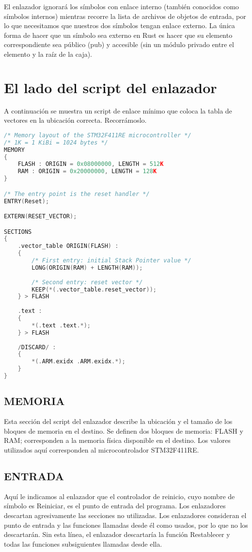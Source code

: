 El enlazador ignorará los símbolos con enlace interno (también conocidos como símbolos internos) mientras recorre la lista de archivos de objetos de entrada, por lo que necesitamos que nuestros dos símbolos tengan enlace externo. La única forma de hacer que un símbolo sea externo en Rust es hacer que su elemento correspondiente sea público (pub) y accesible (sin un módulo privado entre el elemento y la raíz de la caja).

\section{El lado del script del enlazador}

A continuación se muestra un script de enlace mínimo que coloca la tabla de vectores en la ubicación correcta. Recorrámoslo.

\begin{lstlisting}[language=c]
/* Memory layout of the STM32F411RE microcontroller */
/* 1K = 1 KiBi = 1024 bytes */
MEMORY
{
	FLASH : ORIGIN = 0x08000000, LENGTH = 512K
	RAM : ORIGIN = 0x20000000, LENGTH = 128K
}

/* The entry point is the reset handler */
ENTRY(Reset);

EXTERN(RESET_VECTOR);

SECTIONS
{
	.vector_table ORIGIN(FLASH) :
	{
		/* First entry: initial Stack Pointer value */
		LONG(ORIGIN(RAM) + LENGTH(RAM));
		
		/* Second entry: reset vector */
		KEEP(*(.vector_table.reset_vector));
	} > FLASH
	
	.text :
	{
		*(.text .text.*);
	} > FLASH
	
	/DISCARD/ :
	{
		*(.ARM.exidx .ARM.exidx.*);
	}
}

\end{lstlisting}


\subsection{MEMORIA}
Esta sección del script del enlazador describe la ubicación y el tamaño de los bloques de memoria en el destino. Se definen dos bloques de memoria: FLASH y RAM; corresponden a la memoria física disponible en el destino. Los valores utilizados aquí corresponden al microcontrolador STM32F411RE.

\subsection{ENTRADA}
Aquí le indicamos al enlazador que el controlador de reinicio, cuyo nombre de símbolo es Reiniciar, es el punto de entrada del programa. Los enlazadores descartan agresivamente las secciones no utilizadas. Los enlazadores consideran el punto de entrada y las funciones llamadas desde él como usados, por lo que no los descartarán. Sin esta línea, el enlazador descartaría la función Restablecer y todas las funciones subsiguientes llamadas desde ella.


